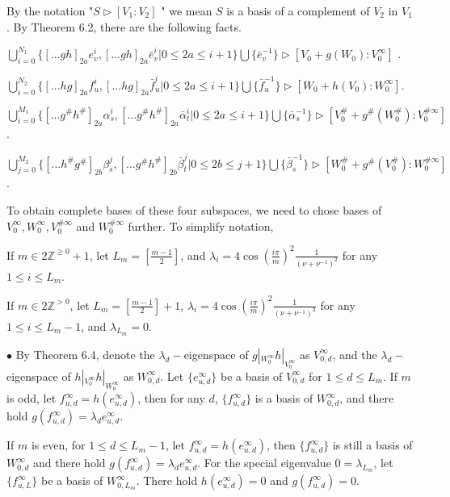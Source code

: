 \def\CTEXPreproc{Created by ctex v0.2.12, don't edit!}\documentclass[11pt]{article}
\begin{document}
By the notation "$S \rhd [V_1 : V_2 ] $   " we mean $S$ is a basis of a complement of $V_2$ in $V_1$. By Theorem 6.2, there are the following facts.

\noindent  $\bigcup^{N_1} _{i=0} \{ [...gh]_{2a}e^i _v , [...gh]_{2a}\bar{e}^i _v  |  0\leq 2a\leq i+1 \}
 \bigcup \{  \bar{e}^{-1}_v  \} \rhd [V_0 +g(W_0 ) : V^{\infty}_0 ] $ .

\noindent $\bigcup^{N_2}_{i=0}\{ [...hg]_{2a}f^i _u ,[...hg]_{2a}\bar{f}^i _u  |  0\leq 2a\leq i+1 \} \bigcup \{ \bar{f}^{-1} _u \} \rhd
[W_0 +h(V_0 ): W^{\infty}_0 ]$.

\noindent $\bigcup^{M_1}_{i=0}\{ [...g^{\#}h^{\#} ]_{2a}\alpha^i _{s} , [...g^{\#}h^{\#}]_{2a}\bar{\alpha}^i _{t}  |  0\leq 2a\leq i+1 \} \bigcup \{ \bar{\alpha}^{-1}_s \} \rhd [V^{\#}_0 +g^{\#}(W^{\#}_0 ): V^{\# \infty}_0 ]$  .

\noindent $\bigcup^{M_2}_{j=0} \{ [...h^{\#}g^{\#} ]_{2b}\beta^j _{s} ,
 [...g^{\#}h^{\#}]_{2b}\bar{\beta}^j _{t}  | 0\leq 2b\leq j+1 \} \bigcup\{ \bar{\beta}^{-1}_s \} \rhd [W^{\#}_0 +g^{\#}(V^{\#}_0 ): W^{\# \infty}_0 ]$ .

 To obtain complete bases of these four subspaces, we need to chose bases of  $V^{\infty}_0 , W^{\infty}_0 ,V^{\# \infty}_0  $ and
  $ W^{\# \infty}_0$ further. To simplify notation,

\noindent If $m\in 2\mathbb{Z}^{\geq0}+1$, let $L_m =[  \frac{m-1}{2}  ]$, and $\lambda_i = 4\cos( \frac{i\pi}{m} )^2 \frac{1}{(\nu + \nu ^{-1})^2 }$ for any $1\leq i\leq L_m$.

\noindent  If  $m\in 2\mathbb{Z}^{>0}$, let $L_m =[  \frac{m-1}{2}  ]+1 $,  $\lambda_i = 4\cos( \frac{i\pi}{m} )^2 \frac{1}{(\nu + \nu ^{-1})^2 }$ for any $1\leq i\leq L_m -1 $, and  $\lambda_{L_m} =0$.


\noindent $\bullet$  By Theorem 6.4, denote the $\lambda_d -$eigenspace of $g|_{W^{\infty}_0 } h|_{V^{\infty}_0 }$ as
$V^{\infty}_{0,d} $, and the  $\lambda_d -$eigenspace of $h|_{V^{\infty}_0 } h|_{W^{\infty}_0 }$ as
$W^{\infty}_{0,d} $. Let $\{  e^{\infty} _{u,d} \}$ be a basis of $V^{\infty}_{0,d}$ for $1\leq d\leq L_{m}$.
If $m$ is odd, let $f^{\infty}_{u,d}= h( e^{\infty}_{u,d} )$, then for any $d$, $\{ f^{\infty}_{u,d} \}$ is a basis of $W^{\infty}_{0,d} $, and there hold $g (  f^{\infty}_{u,d}  )= \lambda_d e^{\infty}_{u,d}   $.

If $m$ is even, for $1\leq d\leq L_{m}-1$, let $f^{\infty}_{u,d}= h ( e^{\infty}_{u,d} )$, then  $\{ f^{\infty}_{u,d} \}$ is still a basis of $W^{\infty}_{0,d} $ and there hold $g (  f^{\infty}_{u,d}  )= \lambda_d e^{\infty}_{u,d}   $. For the special eigenvalue $0=\lambda_{L_m }$, let $\{ f^{\infty}_{u, L}  \}$ be a basis of $W^{\infty}_{0,L_m } $. There hold $ h (e^{\infty}_{u,d})=0 $ and
$g( f^{\infty}_{u,d}  )=0$.
\end{document}
